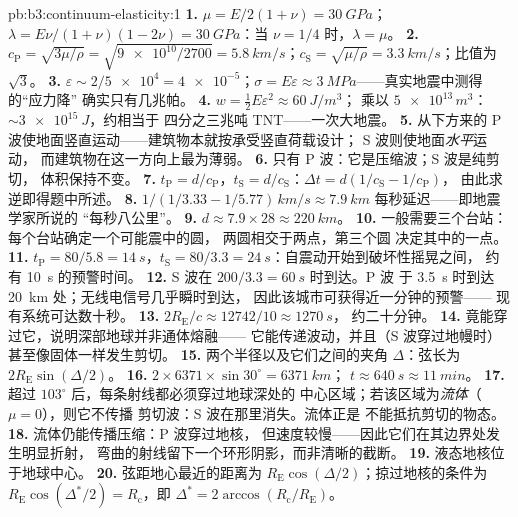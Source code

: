\begin{solution}{pb:b3:continuum-elasticity:1}
\textbf{1.} $\mu = E/2(1+\nu) = \qty{30}{GPa}$；$\lambda =
E\nu/(1+\nu)(1-2\nu) = \qty{30}{GPa}$：当 $\nu = 1/4$ 时，$\lambda =
\mu$。
\textbf{2.} $c_{\text{P}} = \sqrt{3\mu/\rho} = \sqrt{\num{9e10}/2700}
= \qty{5.8}{km/s}$；$c_{\text{S}} = \sqrt{\mu/\rho} =
\qty{3.3}{km/s}$；比值为 $\sqrt3$。
\textbf{3.} $\varepsilon \sim 2/\num{5e4} = \num{4e-5}$；$\sigma =
E\varepsilon \approx \qty{3}{MPa}$——真实地震中测得的“应力降”
确实只有几兆帕。
\textbf{4.} $w = \tfrac12 E\varepsilon^2 \approx \qty{60}{J/m^3}$；
乘以 $\num{5e13}{}\,\unit{m^3}$：$\sim\qty{3e15}{J}$，约相当于
四分之三兆吨 TNT——一次大地震。
\textbf{5.} 从下方来的 P 波使地面竖直运动——建筑物本就按承受竖直荷载设计；
S 波则使地面\emph{水平}运动，
而建筑物在这一方向上最为薄弱。
\textbf{6.} 只有 P 波：它是压缩波；S 波是纯剪切，
体积保持不变。
\textbf{7.} $t_{\text{P}} = d/c_{\text{P}}$，$t_{\text{S}} =
d/c_{\text{S}}$：$\Delta t = d(1/c_{\text{S}} - 1/c_{\text{P}})$，
由此求逆即得题中所述。
\textbf{8.} $1/(1/3.33 - 1/5.77)\,\unit{km/s} \approx
\qty{7.9}{km}$ 每秒延迟——即地震学家所说的
“每秒八公里”。
\textbf{9.} $d \approx 7.9 \times 28 \approx \qty{220}{km}$。
\textbf{10.} 一般需要三个台站：每个台站确定一个可能震中的圆，
两圆相交于两点，第三个圆
决定其中的一点。
\textbf{11.} $t_{\text{P}} = 80/5.8 = \qty{14}{s}$，$t_{\text{S}} =
80/3.3 = \qty{24}{s}$：自震动开始到破坏性摇晃之间，
约有 \qty{10}{s} 的预警时间。
\textbf{12.} S 波在 $200/3.3 = \qty{60}{s}$ 时到达。P 波
于 \qty{3.5}{s} 时到达 \qty{20}{km} 处；无线电信号几乎瞬时到达，
因此该城市可获得近一分钟的预警——
现有系统可达数十秒。
\textbf{13.} $2R_{\text{E}}/c \approx 12742/10 \approx \qty{1270}{s}$，
约二十分钟。
\textbf{14.} 竟能穿过它，说明深部地球并非通体熔融——
它能传递波动，并且（S 波穿过地幔时）
甚至像固体一样发生剪切。
\textbf{15.} 两个半径以及它们之间的夹角 $\Delta$：弦长为
$2R_{\text{E}}\sin(\Delta/2)$。
\textbf{16.} $2 \times 6371 \times \sin30^\circ = \qty{6371}{km}$；
$t \approx \qty{640}{s} \approx \qty{11}{min}$。
\textbf{17.} 超过 $103^\circ$ 后，每条射线都必须穿过地球深处的
中心区域；若该区域为\emph{流体}（$\mu = 0$），则它不传播
剪切波：S 波在那里消失。流体正是
不能抵抗剪切的物态。
\textbf{18.} 流体仍能传播压缩：P 波穿过地核，
但速度较慢——因此它们在其边界处发生明显折射，
弯曲的射线留下一个环形阴影，而非清晰的截断。
\textbf{19.} 液态地核位于地球中心。
\textbf{20.} 弦距地心最近的距离为
$R_{\text{E}}\cos(\Delta/2)$；掠过地核的条件为
$R_{\text{E}}\cos(\Delta^*/2) = R_{\text{c}}$，即 $\Delta^* =
2\arccos(R_{\text{c}}/R_{\text{E}})$。

\end{solution}
